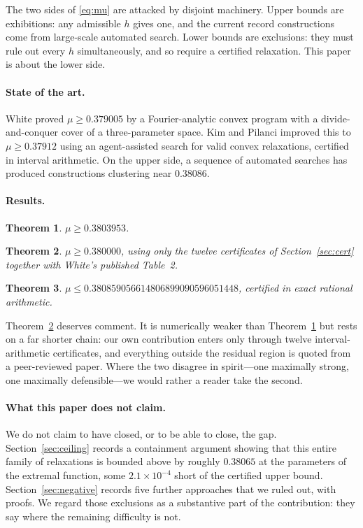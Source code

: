 \documentclass[11pt]{article}
\newtheorem{theorem}{Theorem}
\theoremstyle{definition}
\begin{document}
The two sides of \eqref{eq:mu} are attacked by disjoint machinery. Upper
bounds are exhibitions: any admissible $h$ gives one, and the current
record constructions come from large-scale automated search. Lower
bounds are exclusions: they must rule out every $h$ simultaneously, and
so require a certified relaxation. This paper is about the lower side.

\paragraph{State of the art.} White \cite{White2023} proved
$\mu \ge 0.379005$ by a Fourier-analytic convex program with a
divide-and-conquer cover of a three-parameter space. Kim and
Pilanci \cite{KimPilanci2026} improved this to $\mu \ge 0.37912$ using an
agent-assisted search for valid convex relaxations, certified in interval
arithmetic. On the upper side, a sequence of automated searches has
produced constructions clustering near $0.38086$.

\paragraph{Results.}
\begin{theorem}\label{thm:main}
$\mu \ge 0.3803953$.
\end{theorem}
\begin{theorem}\label{thm:robust}
$\mu \ge 0.380000$, using only the twelve certificates of
Section~\ref{sec:cert} together with White's published Table~2.
\end{theorem}
\begin{theorem}\label{thm:ub}
$\mu \le 0.380859056614806899090596051448$, certified in exact rational
arithmetic.
\end{theorem}

Theorem~\ref{thm:robust} deserves comment. It is numerically weaker than
Theorem~\ref{thm:main} but rests on a far shorter chain: our own
contribution enters only through twelve interval-arithmetic
certificates, and everything outside the residual region is quoted from
a peer-reviewed paper. Where the two disagree in spirit---one maximally
strong, one maximally defensible---we would rather a reader take the
second.

\paragraph{What this paper does not claim.} We do not claim to have
closed, or to be able to close, the gap. Section~\ref{sec:ceiling}
records a containment argument showing that this entire family of
relaxations is bounded above by roughly $0.38065$ at the parameters of
the extremal function, some $2.1\times10^{-4}$ short of the certified
upper bound. Section~\ref{sec:negative} records five further approaches
that we ruled out, with proofs. We regard those exclusions as a
substantive part of the contribution: they say where the remaining
difficulty is not.
\end{document}
